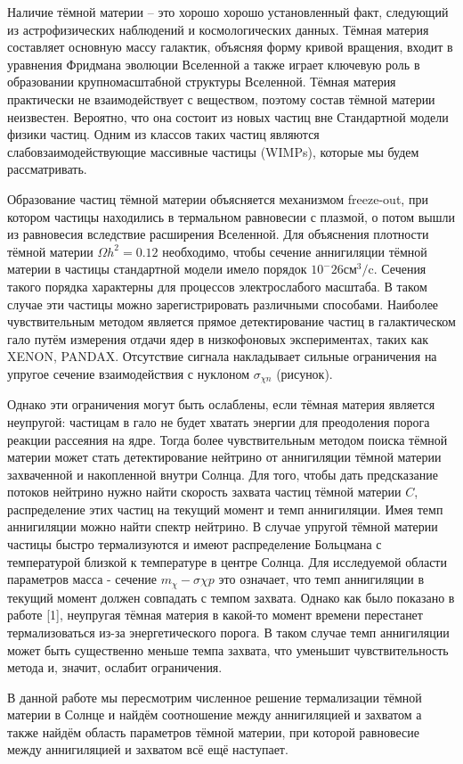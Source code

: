 Наличие тёмной материи – это хорошо хорошо установленный факт, следующий из астрофизических наблюдений и космологических данных. Тёмная материя составляет основную массу галактик, объясняя форму кривой вращения, входит в уравнения Фридмана эволюции Вселенной а также играет ключевую роль в образовании крупномасштабной структуры Вселенной. 	Тёмная материя практически не взаимодействует с веществом, поэтому состав тёмной материи неизвестен. Вероятно, что она состоит из новых частиц вне Стандартной модели физики частиц. Одним из классов таких частиц являются слабовзаимодействующие массивные частицы (WIMPs), которые мы будем рассматривать.


Образование частиц тёмной материи объясняется механизмом freeze-out, при котором частицы находились в термальном равновесии с  плазмой, о потом вышли из равновесия вследствие расширения Вселенной. Для объяснения плотности тёмной материи $\Omega h^2 = 0.12$ необходимо, чтобы сечение аннигиляции тёмной материи в частицы стандартной модели имело порядок $10^-26 \text{см}^3/\text{c}$. Сечения такого порядка характерны для процессов электрослабого масштаба. В таком случае эти частицы можно зарегистрировать различными способами. Наиболее чувствительным методом является прямое детектирование частиц в галактическом гало путём измерения отдачи ядер в низкофоновых экспериментах, таких как XENON, PANDAX. Отсутствие сигнала накладывает сильные ограничения на упругое сечение взаимодействия с нуклоном $\sigma_{\chi n}$ (рисунок).


Однако эти ограничения могут быть ослаблены, если тёмная материя является неупругой: частицам в гало не будет хватать энергии для преодоления порога реакции рассеяния на ядре. Тогда более чувствительным методом поиска тёмной материи может стать детектирование нейтрино от аннигиляции тёмной материи захваченной и накопленной внутри Солнца. Для того, чтобы дать предсказание потоков нейтрино нужно найти скорость захвата частиц тёмной материи $C$, распределение этих частиц на текущий момент и темп аннигиляции. Имея темп аннигиляции можно найти спектр нейтрино. В случае упругой тёмной материи частицы быстро термализуются и имеют распределение Больцмана с температурой близкой к температуре в центре Солнца. Для исследуемой области параметров масса - сечение $m_{\chi} - \sigma{\chi p}$ это означает, что темп аннигиляции в текущий момент должен совпадать с темпом захвата. Однако как было показано в работе [1], неупругая тёмная материя в какой-то момент времени перестанет термализоваться из-за энергетического порога. В таком случае темп аннигиляции может быть существенно меньше темпа захвата, что уменьшит чувствительность метода и, значит, ослабит ограничения.


В данной работе мы пересмотрим численное решение термализации тёмной материи в Солнце и найдём соотношение между аннигиляцией и захватом а также найдём область параметров тёмной материи, при которой равновесие между аннигиляцией и захватом всё ещё наступает.
